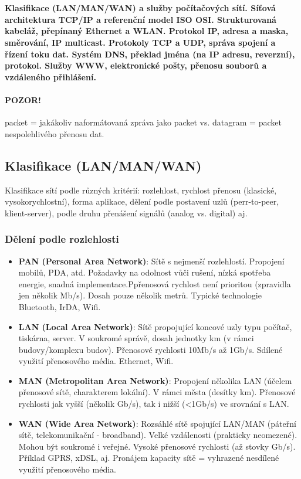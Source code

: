 \documentclass[10pt,a4paper]{article}
\begin{document}
\newpage
\section{}
\paragraph{Klasifikace (LAN/MAN/WAN) a služby počítačových sítí. Síťová architektura TCP/IP a referenční model
ISO OSI. Strukturovaná kabeláž, přepínaný Ethernet a WLAN. Protokol IP, adresa a maska, směrování, IP
multicast. Protokoly TCP a UDP, správa spojení a řízení toku dat. Systém DNS, překlad jména (na IP adresu,
reverzní), protokol. Služby WWW, elektronické pošty, přenosu souborů a vzdáleného přihlášení.}
\paragraph{POZOR!} packet = jakákoliv naformátovaná zpráva jako packet vs. datagram = packet nespolehlivého přenosu dat.
\subsection{Klasifikace (LAN/MAN/WAN)}
Klasifikace sítí podle různých kritérií: rozlehlost, rychlost přenosu (klasické, vysokorychlostní), forma aplikace, dělení podle postavení uzlů (perr-to-peer, klient-server), podle druhu přenášení signálů (analog vs. digital) aj.
\subsubsection{Dělení podle rozlehlosti}
\begin{itemize}
	\item \textbf{PAN (Personal Area Network)}: Sítě s nejmenší rozlehlostí. Propojení mobilů, PDA, atd. Požadavky na odolnost vůči rušení, nízká spotřeba energie, snadná implementace.Ppřenosová rychlost není prioritou (zpravidla jen několik Mb/s). Dosah pouze několik metrů. Typické technologie Bluetooth, IrDA, Wifi.
	\item \textbf{LAN (Local Area Network)}: Sítě propojující koncové uzly typu počítač, tiskárna, server. V soukromé správě, dosah jednotky km (v rámci budovy/komplexu budov). Přenosové rychlosti 10Mb/s až 1Gb/s. Sdílené využití přenosového média. Ethernet, Wifi.
	\item \textbf{MAN (Metropolitan Area Network)}: Propojení několika LAN (účelem přenosové sítě, charakterem lokální). V rámci města (desítky km). Přenosové rychlosti jak vyšší (několik Gb/s), tak i nižší (<1Gb/s) ve srovnání s LAN.
	\item \textbf{WAN (Wide Area Network)}: Rozsáhlé sítě spojující LAN/MAN (páteřní sítě, telekomunikační - broadband). Velké vzdálenosti (prakticky neomezené). Mohou být soukromé i veřejné. Vysoké přenosové rychlosti (až stovky Gb/s). Příklad GPRS, xDSL, aj. Pronájem kapacity sítě = vyhrazené nesdílené využití přenosového média.
\end{itemize}
\end{document}
